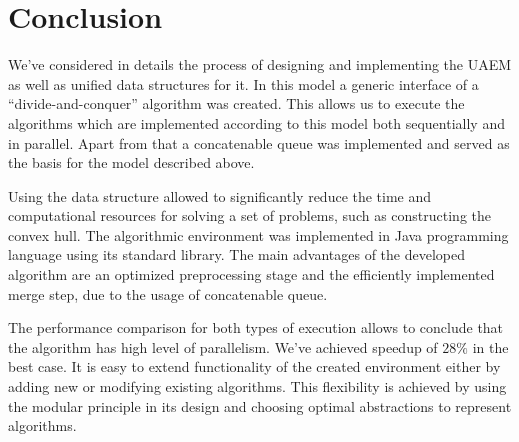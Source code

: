 \documentclass[twoside,twocolumn,10pt]{article}
\begin{document}
\section{Conclusion}
\label{sec:coclusion}

	We've considered in details the process of designing and implementing the UAEM as well as unified data structures for it. In this model a generic interface of a ``divide-and-conquer'' algorithm was created. This allows us to execute the algorithms which are implemented according to this model both sequentially and in parallel. Apart from that a concatenable queue was implemented and served as the basis for the model described above.
	
	Using the data structure allowed to significantly reduce the time and computational resources for solving a set of problems, such as constructing the convex hull. The algorithmic environment was implemented in Java programming language using its standard library. The main advantages of the developed algorithm are an optimized preprocessing stage and the efficiently implemented merge step, due to the usage of concatenable queue.
	
	The performance comparison for both types of execution allows to conclude that the algorithm has high level of parallelism. We've achieved speedup of $28\%$ in the best case. It is easy to extend functionality of the created environment either by adding new or modifying existing algorithms. This flexibility is achieved by using the modular principle in its design and choosing optimal abstractions to represent algorithms.
\end{document}
